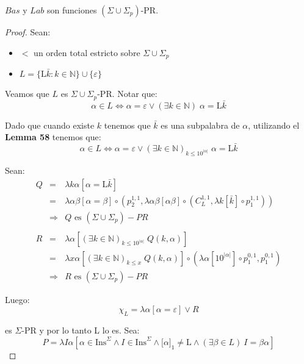   \begin{lemma}
    \PN $Bas$ y $Lab$ son funciones $(\Sigma \cup \Sigma_{p})$-PR.
  \end{lemma}
  \begin{proof}
    \PN Sean:
    \begin{itemize}
      \item $<$ un orden total estricto sobre $\Sigma \cup \Sigma_{p}$
      \item $L = \{ \mathrm{L}\bar{k}:k\in \mathbb{N}\} \cup \{\varepsilon \}$
    \end{itemize}

    \PN Veamos que $L$ es $\Sigma \cup \Sigma_{p}$-PR. Notar que:
    \[
      \alpha \in L \Leftrightarrow \alpha = \varepsilon \vee (\exists k \in \mathbb{N}) \; \alpha = \mathrm{L}\bar{k}
    \]

    \PN Dado que cuando existe $k$ tenemos que $\bar{k}$ es una subpalabra de $\alpha $, utilizando el \textbf{Lemma 58}
    tenemos que:
    \[
      \alpha \in L \Leftrightarrow \alpha = \varepsilon \vee (\exists k \in \mathbb{N})_{k \leq 10^{\lvert \alpha
      \rvert}} \; \alpha = \mathrm{L}\bar{k}
    \]

    \PN Sean:
    \begin{eqnarray*}
      Q &=& \lambda k\alpha \left[\alpha = \mathrm{L}\bar{k}\right] \\
      &=& \lambda \alpha\beta \left[\alpha = \beta\right] \circ \left(p_{2}^{1,1}, \lambda \alpha\beta \left[\alpha\beta
        \right] \circ \left(C_{L}^{1,1},\lambda k \left[\bar{k}\right] \circ p_{1}^{1,1}\right)\right) \\
      &\Rightarrow& Q \text{ es } (\Sigma \cup \Sigma_{p})-PR \\
      \\
      R &=& \lambda \alpha \left[(\exists k \in \mathbb{N})_{k \leq 10^{\lvert \alpha \rvert}} \; Q(k,\alpha)\right] \\
      &=& \lambda x\alpha \left[(\exists k \in \mathbb{N})_{k \leq x} \; Q(k,\alpha)\right] \circ \left(\lambda \alpha
        \left[10^{\lvert \alpha \rvert}\right] \circ p_{1}^{0,1}, p_{1}^{0,1}\right) \\
      &\Rightarrow& R \text{ es } (\Sigma \cup \Sigma_{p})-PR
    \end{eqnarray*}

    \PN Luego:
    \[
      \chi_{L} = \lambda \alpha \left[\alpha = \varepsilon\right] \vee R
    \]

    \PN es $\Sigma$-PR y por lo tanto L lo es. Sea:
    \[
      P = \lambda I\alpha \left[\alpha \in \mathrm{Ins}^{\Sigma} \wedge I \in \mathrm{Ins}^{\Sigma} \wedge \lbrack
      \alpha]_{1} \neq \mathrm{L} \wedge (\exists \beta \in L)\ I = \beta\alpha\right]
    \]


\end{proof}

